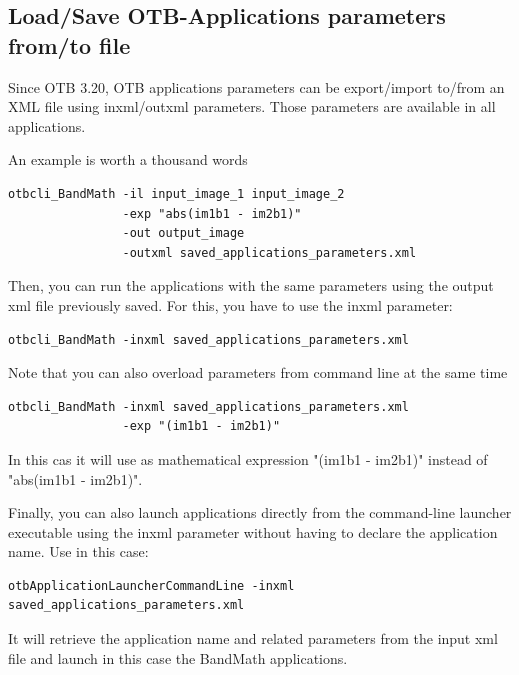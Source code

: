 \subsection{Load/Save OTB-Applications parameters from/to file}

Since OTB 3.20, OTB applications parameters can be export/import to/from an XML
file using inxml/outxml parameters. Those parameters are available in all
applications.

An example is worth a thousand words

\begin{verbatim}
otbcli_BandMath -il input_image_1 input_image_2
                -exp "abs(im1b1 - im2b1)"
                -out output_image
                -outxml saved_applications_parameters.xml
\end{verbatim}

Then, you can run the applications with the same parameters using the output xml
file previously saved. For this, you have to use the inxml parameter:

\begin{verbatim}
otbcli_BandMath -inxml saved_applications_parameters.xml
\end{verbatim}

Note that you can also overload parameters from command line at the same time

\begin{verbatim}
otbcli_BandMath -inxml saved_applications_parameters.xml 
                -exp "(im1b1 - im2b1)"
\end{verbatim}

In this cas it will use as mathematical expression "(im1b1 - im2b1)" instead
of "abs(im1b1 - im2b1)".

Finally, you can also launch applications directly from the command-line launcher executable using
the inxml parameter without having to declare the application name. Use in this case:

\begin{verbatim}
otbApplicationLauncherCommandLine -inxml saved_applications_parameters.xml
\end{verbatim}
 
It will retrieve the application name and related parameters from the input xml
file and launch in this case the BandMath applications.

 
